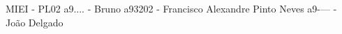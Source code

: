 M\+I\+EI -\/ P\+L02 a9.... -\/ Bruno a93202 -\/ Francisco Alexandre Pinto Neves a9-\/--- -\/ João Delgado 